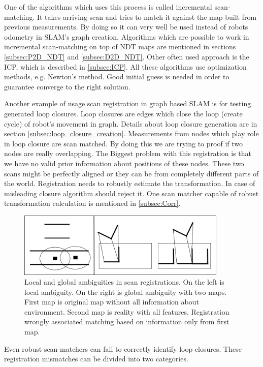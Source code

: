 One of the algorithms which uses this process is called incremental scan-matching. It takes arriving scan and tries to match it against the map built from previous measurements. By doing so it can very well be used instead of robots odometry in \gls{SLAM}'s graph creation. Algorithms which are possible to work in incremental scan-matching on top of \gls{NDT} maps are mentioned in sections \ref{subsec:P2D_NDT} and \ref{subsec:D2D_NDT}. Other often used approach is the \gls{ICP}, which is described in \ref{subsec:ICP}. All these algorithms use optimization methods, e.g. Newton's method. Good initial guess is needed in order to guarantee converge to the right solution. 

Another example of usage scan registration in graph based \gls{SLAM} is for testing generated loop closures. Loop closures are edges which close the loop (create cycle) of robot's movement in graph. Details about loop closure generation are in section \ref{subsec:loop_closure_creation}. Measurements from nodes which play role in loop closure are scan matched. By doing this we are trying to proof if two nodes are really overlapping.  The Biggest problem with this registration is that we have no valid prior information about positions of these nodes. These two scans might be perfectly aligned or they can be from completely different parts of the world. Registration needs to robustly estimate the transformation. In case of misleading closure algorithm should reject it. One scan matcher capable of robust transformation calculation is mentioned in \ref{subsec:Corr}.  

\begin{figure}
\centering
\includegraphics[width=100mm]{../img/ambi.png} 	
\caption{Local and global ambiguities in scan registrations. On the left is local ambiguity. On the right is global ambiguity with two maps. First map is original map without all information about environment. Second map is reality with all features. Registration wrongly associated matching based on information only from first map.} \label{fig:ambig}

\end{figure}

Even robust scan-matchers can fail to correctly identify loop closures.  These registration mismatches can be divided into two categories.

